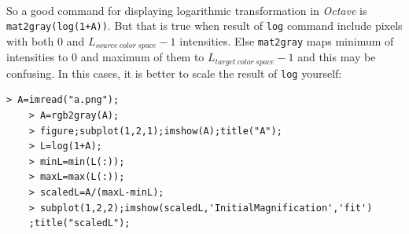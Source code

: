 \paragraph*{}So a good command for displaying logarithmic transformation in \emph{Octave} is
\texttt{mat2gray(log(1+A))}. But that is true when result of \texttt{log}
command include pixels with both $0$ and $L_{source\ color\ space}-1$ intensities. Else
\texttt{mat2gray} maps minimum of intensities to $0$ and maximum of them to
$L_{target\ color\ space}-1$ and this may be confusing. In this cases, it is
better to scale the result of \texttt{log} yourself:
\begin{Verbatim}[frame=single,label=Octave lab:\ Scale matrix yourself ]
    > A=imread("a.png");
    > A=rgb2gray(A);
    > figure;subplot(1,2,1);imshow(A);title("A");
    > L=log(1+A);
    > minL=min(L(:));
    > maxL=max(L(:));
    > scaledL=A/(maxL-minL);
    > subplot(1,2,2);imshow(scaledL,'InitialMagnification','fit')
    ;title("scaledL"); 
\end{Verbatim}

\pagebreak